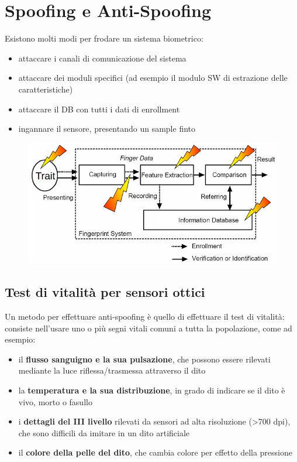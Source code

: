 \documentclass{report}
\begin{document}
\chapter{Spoofing e Anti-Spoofing}
Esistono molti modi per frodare un sistema biometrico:
\begin{itemize}
    \item attaccare i canali di comunicazione del sistema
    \item attaccare dei moduli specifici (ad esempio il modulo SW di estrazione delle caratteristiche)
    \item attaccare il DB con tutti i dati di enrollment
    \item ingannare il sensore, presentando un sample finto
\end{itemize}

\begin{figure}[ht]
    \centering
    \includegraphics[width=0.75\linewidth]{images/frodare.png}
\end{figure}

\newpage
\section{Test di vitalità per sensori ottici}
Un metodo per effettuare anti-spoofing è quello di effettuare il test di vitalità:
consiste nell'usare uno o più segni vitali comuni a tutta la popolazione,
come ad esempio:
\begin{itemize}
    \item il \textbf{flusso sanguigno e la sua pulsazione}, che possono essere rilevati mediante la luce riflessa/trasmessa attraverso il dito 
    \item la \textbf{temperatura e la sua distribuzione}, in grado di indicare se il dito è vivo, morto o fasullo
    \item i \textbf{dettagli del III livello} rilevati da sensori ad alta risoluzione (>700 dpi), che sono difficili da imitare in un dito artificiale
    \item il \textbf{colore della pelle del dito}, che cambia colore per effetto della pressione
\end{itemize}
\end{document}
